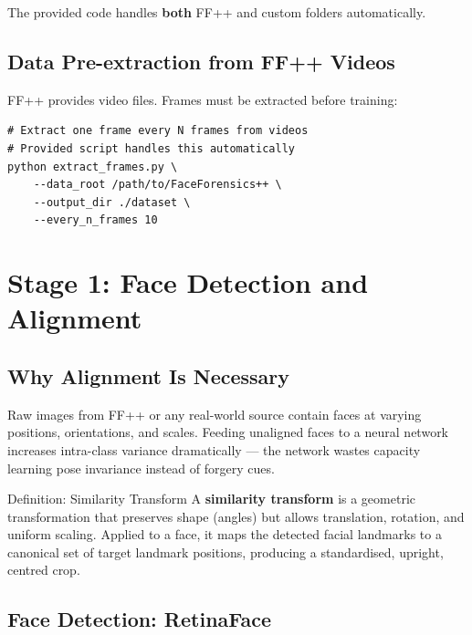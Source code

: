 \documentclass[12pt,a4paper]{article}
\begin{document}
The provided code handles \textbf{both} FF++ and custom folders automatically.

\subsection{Data Pre-extraction from FF++ Videos}

FF++ provides video files. Frames must be extracted before training:

\begin{lstlisting}[caption={Frame extraction from FF++ (provided in codebase as extract\_frames.py)}]
# Extract one frame every N frames from videos
# Provided script handles this automatically
python extract_frames.py \
    --data_root /path/to/FaceForensics++ \
    --output_dir ./dataset \
    --every_n_frames 10
\end{lstlisting}

\newpage

\section{Stage 1: Face Detection and Alignment}

\subsection{Why Alignment Is Necessary}

Raw images from FF++ or any real-world source contain faces at varying positions,
orientations, and scales. Feeding unaligned faces to a neural network increases
intra-class variance dramatically --- the network wastes capacity learning pose
invariance instead of forgery cues.

\begin{definitionbox}{Definition: Similarity Transform}
A \textbf{similarity transform} is a geometric transformation that preserves shape
(angles) but allows translation, rotation, and uniform scaling. Applied to a face, it
maps the detected facial landmarks to a canonical set of target landmark positions,
producing a standardised, upright, centred crop.
\end{definitionbox}

\subsection{Face Detection: RetinaFace}
\end{document}
